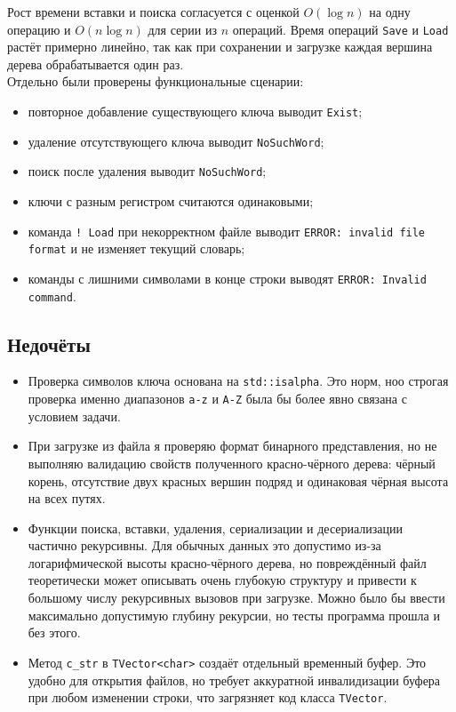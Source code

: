 \documentclass[12pt]{article}
\begin{document}
Рост времени вставки и поиска согласуется с оценкой $O(\log n)$ на одну операцию и $O(n \log n)$ для серии из $n$ операций. Время операций \texttt{Save} и \texttt{Load} растёт примерно линейно, так как при сохранении и загрузке каждая вершина дерева обрабатывается один раз. \\

Отдельно были проверены функциональные сценарии:
\begin{itemize}
\item повторное добавление существующего ключа выводит \texttt{Exist};
\item удаление отсутствующего ключа выводит \texttt{NoSuchWord};
\item поиск после удаления выводит \texttt{NoSuchWord};
\item ключи с разным регистром считаются одинаковыми;
\item команда \texttt{! Load} при некорректном файле выводит \texttt{ERROR: invalid file format} и не изменяет текущий словарь;
\item команды с лишними символами в конце строки выводят \texttt{ERROR: Invalid command}.
\end{itemize}

\subsection*{Недочёты}

\begin{itemize}
\item Проверка символов ключа основана на \texttt{std::isalpha}. Это норм, ноо строгая проверка именно диапазонов \texttt{a-z} и \texttt{A-Z} была бы более явно связана с условием задачи.
\item При загрузке из файла я проверяю формат бинарного представления, но не выполняю валидацию свойств полученного красно-чёрного дерева: чёрный корень, отсутствие двух красных вершин подряд и одинаковая чёрная высота на всех путях.
\item Функции поиска, вставки, удаления, сериализации и десериализации частично рекурсивны. Для обычных данных это допустимо из-за логарифмической высоты красно-чёрного дерева, но повреждённый файл теоретически может описывать очень глубокую структуру и привести к большому числу рекурсивных вызовов при загрузке. Можно было бы ввести максимально допустимую глубину рекурсии, но тесты программа прошла и без этого.
\item Метод \texttt{c\_str} в \texttt{TVector<char>} создаёт отдельный временный буфер. Это удобно для открытия файлов, но требует аккуратной инвалидизации буфера при любом изменении строки, что загрязняет код класса \texttt{TVector}.
\end{itemize}
\end{document}
